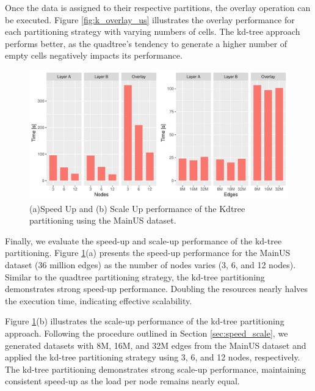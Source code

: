 Once the data is assigned to their respective partitions, the overlay operation can be executed.  Figure \ref{fig:k_overlay_us} illustrates the overlay performance for each partitioning strategy with varying numbers of cells. The kd-tree approach performs better, as the quadtree’s tendency to generate a higher number of empty cells negatively impacts its performance.

\begin{figure}
    \centering
    \includegraphics[width=\textwidth]{chapterExtension/K_SS/K_SS}
    \caption{(a)Speed Up and (b) Scale Up performance of the Kdtree partitioning using the MainUS dataset.} \label{fig:k_scale_speed_us}
\end{figure}

Finally, we evaluate the speed-up and scale-up performance of the kd-tree partitioning. Figure \ref{fig:k_scale_speed_us}(a) presents the speed-up performance for the MainUS dataset (36 million edges) as the number of nodes varies (3, 6, and 12 nodes). Similar to the quadtree partitioning strategy, the kd-tree partitioning demonstrates strong speed-up performance. Doubling the resources nearly halves the execution time, indicating effective scalability.

Figure \ref{fig:k_scale_speed_us}(b) illustrates the scale-up performance of the kd-tree partitioning approach. Following the procedure outlined in Section \ref{sec:speed_scale}, we generated datasets with 8M, 16M, and 32M edges from the MainUS dataset and applied the kd-tree partitioning strategy using 3, 6, and 12 nodes, respectively. The kd-tree partitioning demonstrates strong scale-up performance, maintaining consistent speed-up as the load per node remains nearly equal.


